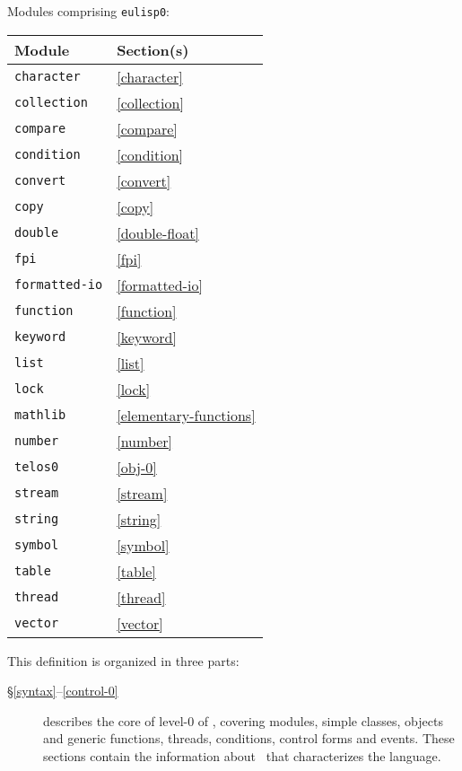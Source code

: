 \begin{optDefinition}
Modules comprising {\tt eulisp0}:
\begin{center}
    \label{level-0-modules}
    \begin{tabular}{|ll|}\hline
        Module & Section(s)\\\hline
        {\tt character} & \ref{character}\\
        {\tt collection} & \ref{collection}\\
        {\tt compare} & \ref{compare}\\
        {\tt condition} & \ref{condition}\\
        {\tt convert} & \ref{convert}\\
        {\tt copy} & \ref{copy}\\
        {\tt double} & \ref{double-float}\\
        {\tt fpi} & \ref{fpi}\\
        {\tt formatted-io} & \ref{formatted-io}\\
        {\tt function} & \ref{function}\\
        {\tt keyword} & \ref{keyword}\\
        {\tt list} & \ref{list}\\
        {\tt lock} & \ref{lock}\\
        {\tt mathlib} & \ref{elementary-functions}\\
        {\tt number} & \ref{number}\\
        {\tt telos0} & \ref{obj-0}\\
        {\tt stream} & \ref{stream}\\
        {\tt string} & \ref{string}\\
        {\tt symbol} & \ref{symbol}\\
        {\tt table} & \ref{table}\\
        {\tt thread} & \ref{thread}\\
        {\tt vector} & \ref{vector}\\\hline
    \end{tabular}
\end{center}
%
\noindent
This definition is organized in three parts:
\begin{description}
    \item[\S \ref{syntax}--\ref{control-0}] describes the core of level-0
    of \eulisp, covering modules, simple classes, objects and generic functions,
    threads, conditions, control forms and events.  These sections contain the
    information about \eulisp\ that characterizes the language.

\end{description}
\end{optDefinition}
